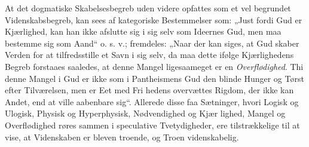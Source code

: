 \documentclass[12pt]{book}
\newcommand{\opage}[1]{\marginnote{\footnotesize\textit{[#1]}}}
\begin{document}
At det dogmatiske Skabelsesbegreb uden videre opfattes
som et vel begrundet Videnskabsbegreb, kan sees af kategoriske
Bestemmelser som: „Just fordi Gud er Kjærlighed, kan han
ikke afslutte sig i sig selv som Ideernes Gud, men maa bestemme
sig som Aand“ o. s. v.; fremdeles: „Naar der kan siges, at
Gud skaber Verden for at tilfredsstille et Savn i sig selv, da maa
dette ifølge Kjærlighedens Begreb forstaaes saaledes, at denne
\opage{98}\setcounter{footnote}{0}%
Mangel ligesaameget er en \emph{Overflødighed}. Thi denne
Mangel i Gud er ikke som i Pantheismens Gud den blinde
Hunger og Tørst efter Tilværelsen, men er Eet med Fri\-%
hedens overvættes Rigdom, der ikke kan Andet, end at ville
aabenbare sig“. Allerede disse faa Sætninger, hvori Logisk
og Ulogisk, Physisk og Hyperphysisk, Nødvendighed og Kjær\-%
lighed, Mangel og Overflødighed røres sammen i speculative
Tvetydigheder, ere tilstrækkelige til at vise, at Videnskaben er
bleven troende, og Troen videnskabelig.
\end{document}
